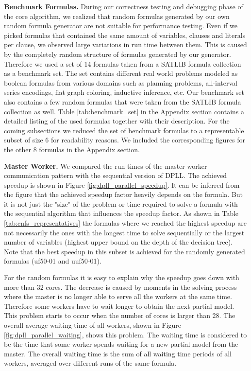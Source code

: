 \documentclass[letterpaper]{article}
\newcommand{\mypar}[1]{{\bf #1.}}
\begin{document}
\mypar{Benchmark Formulas}
During our correctness testing and debugging phase of the core algorithm, we realized that random formulas generated by our own random formula generator are not suitable for performance testing.
Even if we picked formulas that contained the same amount of variables, clauses and literals per clause, we observed large variations in run time between them.
This is caused by the completely random structure of formulas generated by our generator.
Therefore we used a set of 14 formulas taken from a SATLIB formula collection as a benchmark set. \cite{cnf_website}
The set contains different real world problems modeled as boolean formulas from various domains such as planning problems,
all-interval series encodings, flat graph coloring, inductive inference, etc.
Our benchmark set also contains a few random formulas that were taken from the SATLIB formula collection as well.
Table \ref{tab:benchmark_set} in the Appendix section contains a detailed listing of the used formulas together with their description.
For the coming subsections we reduced the set of benchmark formulas to a representable subset of size 6 for readability reasons.
We included the corresponding figures for the other 8 formulas in the Appendix section.

\mypar{Master Worker}
We compared the run times of the master worker communication pattern with the sequential version of DPLL.
The achieved speedup is shown in Figure \ref{fig:dpll_parallel_speedup}.
It can be inferred from the figure that the achieved speedup factor heavily depends on the formula.
But it is not just the "size" of the problem or time required to solve a formula with the sequential algorithm that influences the speedup factor.
As shown in Table \ref{tab:cnfs_representatives} the formulas where we reached the highest speedup are not necessarily the ones with the longest time to solve sequentially or the largest number of variables (highest upper bound on the depth of the decision tree).
Note that the best speedup in this subset is achieved for the randomly generated formulas (uf50-01 and uuf50-01).

For the random formulas it is easy to explain why the speedup goes down with more than 32 cores.
The decrease is caused by moments in the solving process where the master is no longer able to serve all the workers at the same time.
Therefore some workers have to wait longer to obtain the next partial model.
This problem starts to occur when the number of cores is larger than 28.
The overall average waiting time of all workers, shown in Figure \ref{fig:dpll_parallel_waiting}, shows this problem.
The waiting time is considered to be the time that some worker spends waiting for a new partial model from the master.
The overall waiting time is the sum of all waiting time periods of all workers, averaged over different runs of the same formula.
\end{document}
